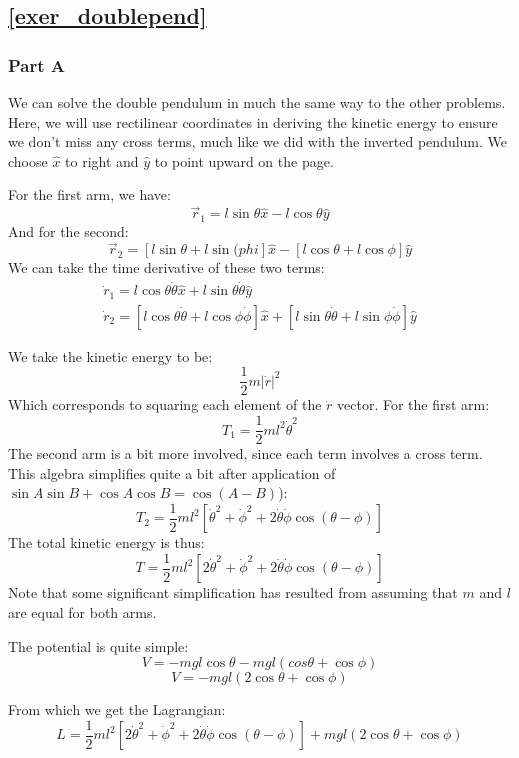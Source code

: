 \subsection*{\texorpdfstring{\autoref{exer_doublepend}}{Double Pend Sol}}

\subsubsection{Part A}
We can solve the double pendulum in much the same way to the other problems. Here, we will use rectilinear coordinates in deriving the kinetic energy to ensure we don't miss any cross terms, much like we did with the inverted pendulum. We choose $\hat{x}$ to right and $\hat{y}$ to point upward on the page.

For the first arm, we have:
$$\vec{r}_1=l\sin\theta\hat{x}-l\cos\theta\hat{y}$$
And for the second:
$$\vec{r}_2=[l\sin\theta+l\sin(phi]\hat{x}-[l\cos\theta+l\cos\phi]\hat{y}$$
We can take the time derivative of these two terms:
\begin{gather}
\dot{r}_1=l\cos\theta\dot{\theta}\hat{x}+l\sin\theta\dot{\theta}\hat{y}\\
\dot{{r}}_2=[l\cos\theta\dot{\theta}+l\cos\phi\dot{\phi}]\hat{x}+[l\sin\theta\dot{\theta}+l\sin\phi\dot{\phi}]\hat{y}
\end{gather}

We take the kinetic energy to be:
$$\frac{1}{2}m|\dot{r}|^2$$
Which corresponds to squaring each element of the $\dot{r}$ vector. For the first arm:
$$T_1=\frac{1}{2}ml^2\dot{\theta}^2$$
The second arm is a bit more involved, since each term involves a cross term. This algebra simplifies quite a bit after application of  $\sin A\sin B+\cos A\cos B = \cos(A-B)$):
$$T_2=\frac{1}{2}ml^2\left[\dot{\theta}^2+\dot{\phi}^2+2\dot{\theta}\dot{\phi}\cos(\theta-\phi)\right]$$
The total kinetic energy is thus:
$$T=\frac{1}{2}ml^2\left[2\dot{\theta}^2+\dot{\phi}^2+2\dot{\theta}\dot{\phi}\cos(\theta-\phi)\right]$$
Note that some significant simplification has resulted from assuming that $m$ and $l$ are equal for both arms.

The potential is quite simple:
$$V=-mgl\cos\theta-mgl(cos\theta+\cos\phi)$$
$$V=-mgl(2\cos\theta+\cos\phi)$$

From which we get the Lagrangian:
$$L=\frac{1}{2}ml^2\left[2\dot{\theta}^2+\dot{\phi}^2+2\dot{\theta}\dot{\phi}\cos(\theta-\phi)\right]+mgl(2\cos\theta+\cos\phi)$$

